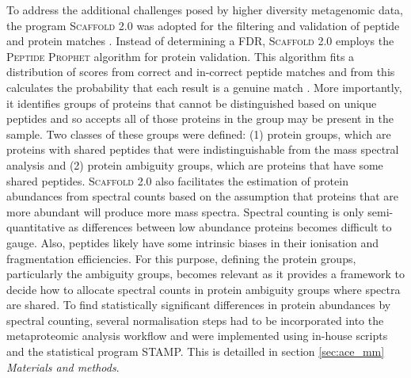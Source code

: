 To address the additional challenges posed by higher diversity metagenomic data, the program \textsc{Scaffold} 2.0 was adopted for the filtering and validation of peptide and protein matches . 
Instead of determining a \ac{FDR}, \textsc{Scaffold} 2.0 employs the \textsc{Peptide Prophet} algorithm \cite{Keller2002} for protein validation.
This algorithm fits a distribution of scores from correct and in-correct peptide matches and from this calculates the probability that each result is a genuine match \cite{Keller2002}. 
More importantly, it identifies groups of proteins that cannot be distinguished based on unique peptides and so accepts all of those proteins in the group may be present in the sample.
Two classes of these groups were defined: (1) protein groups, which are proteins with shared peptides that were indistinguishable from the mass spectral analysis and (2) protein ambiguity groups, which are proteins that have some shared peptides.
\textsc{Scaffold} 2.0 also facilitates the estimation of protein abundances from spectral counts based on the assumption that proteins that are more abundant will produce more mass spectra.
Spectral counting is only semi-quantitative as differences between low abundance proteins becomes difficult to gauge.
Also, peptides likely have some intrinsic biases in their ionisation and fragmentation efficiencies.
For this purpose, defining the protein groups, particularly the ambiguity groups, becomes relevant as it provides a framework to decide how to allocate spectral counts in protein ambiguity groups where spectra are shared.
To find statistically significant differences in protein abundances by spectral counting, several normalisation steps had to be incorporated into the metaproteomic analysis workflow and were implemented using in-house scripts and the statistical program \ac{STAMP}.
This is detailled in section \ref{sec:ace_mm} \emph{Materials and methods}.

